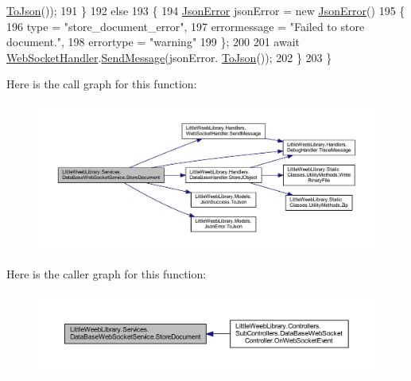 \begin{DoxyCode}
      \mbox{\hyperlink{class_little_weeb_library_1_1_models_1_1_json_success_a407103dc37a77aaf47a782296bab7518}{ToJson}}());
191             \}
192             \textcolor{keywordflow}{else}
193             \{
194                 \mbox{\hyperlink{class_little_weeb_library_1_1_models_1_1_json_error}{JsonError}} jsonError = \textcolor{keyword}{new} \mbox{\hyperlink{class_little_weeb_library_1_1_models_1_1_json_error}{JsonError}}()
195                 \{
196                     type = \textcolor{stringliteral}{"store\_document\_error"},
197                     errormessage = \textcolor{stringliteral}{"Failed to store document."},
198                     errortype = \textcolor{stringliteral}{"warning"}
199                 \};
200 
201                 await \mbox{\hyperlink{class_little_weeb_library_1_1_handlers_1_1_web_socket_handler}{WebSocketHandler}}.\mbox{\hyperlink{class_little_weeb_library_1_1_handlers_1_1_web_socket_handler_a1de289d54d665a32c93478c68d3e6ad0}{SendMessage}}(jsonError.
      \mbox{\hyperlink{class_little_weeb_library_1_1_models_1_1_json_error_a0e3e7dd2e2990404b7f0461742b23440}{ToJson}}());
202             \}
203         \}
\end{DoxyCode}
Here is the call graph for this function\+:\nopagebreak
\begin{figure}[H]
\begin{center}
\leavevmode
\includegraphics[width=350pt]{class_little_weeb_library_1_1_services_1_1_data_base_web_socket_service_af85671a494e85f8418f60606566521f0_cgraph}
\end{center}
\end{figure}
Here is the caller graph for this function\+:\nopagebreak
\begin{figure}[H]
\begin{center}
\leavevmode
\includegraphics[width=350pt]{class_little_weeb_library_1_1_services_1_1_data_base_web_socket_service_af85671a494e85f8418f60606566521f0_icgraph}
\end{center}
\end{figure}
